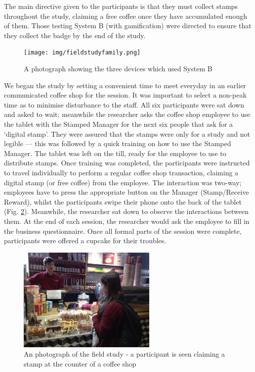 The main directive given to the participants is that they must collect stamps throughout the study, claiming a free coffee once they have accumulated enough of them. Those testing System B (with gamification) were directed to ensure that they collect the badge by the end of the study. 

\begin{figure}[H]
 \centering
  \texttt{[image: img/fieldstudyfamily.png]}
     \caption{A photograph showing the three devices which used System B}
     \label{fig:fieldstudyfamily}
\end{figure}

We began the study by setting a convenient time to meet everyday in an earlier communicated coffee shop for the session. It was important to select a non-peak time as to minimise disturbance to the staff. All six participants were sat down and asked to wait; meanwhile the researcher asks the coffee shop employee to use the tablet with the Stamped Manager  for the next six people that ask for a `digital stamp'. They were assured that the stamps were only for a study and not legible --- this was followed by a quick training on how to use the Stamped Manager. The tablet was left on the till, ready for the employee to use to distribute stamps.
\newpage
Once training was completed, the participants were instructed to travel individually to perform a regular coffee shop transaction, claiming a digital stamp (or free coffee) from the employee. The interaction was two-way; employees have to press the appropriate button on the Manager (Stamp/Receive Reward), whilst the participants swipe their phone onto the back of the tablet (Fig. \ref{fig:hollystamping}). Meanwhile, the researcher sat down to observe the interactions between them. At the end of each session, the researcher would ask the employee to fill in the business questionnaire. Once all formal parts of the session were complete, participants were offered a cupcake for their troubles.

\begin{figure}[H]
 \centering
  \includegraphics[width=0.6\textwidth]{img/hollystamping.jpg}	
     \caption{An photograph of the field study - a participant is seen claiming a stamp at the counter of a coffee shop}
     \label{fig:hollystamping}
\end{figure}

